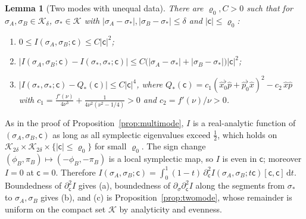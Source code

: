 \documentclass[11pt,a4paper]{article}
\makeatletter
\theoremstyle{stmt}
\newtheorem{lemma}[theorem]{Lemma}
\theoremstyle{defn}
\theoremstyle{rmk}
\renewenvironment{proof}[1][\proofname]{\par\pushQED{\qed}\normalfont\topsep6\p@\@plus6\p@\relax
  \trivlist\item[\hskip\labelsep{\sffamily\itshape\small #1.}]\ignorespaces}{\popQED\endtrivlist\@endpefalse}
\numberwithin{equation}{section}
\newcommand{\dd}{\mathrm{d}}
\makeatother
\begin{document}
\begin{lemma}[Two modes with unequal data]\label{lem:unequal}
There are $\varrho_0,C>0$ such that for $\sigma_A,\sigma_B\in\mathcal K_\delta$, $\sigma_*\in\mathcal K$ with $|\sigma_A-\sigma_*|,|\sigma_B-\sigma_*|\le\delta$ and $|\mathsf c|\le\varrho_0$:
\begin{enumerate}[label=\textup{(\alph*)}]
\item $0\le I(\sigma_A,\sigma_B;\mathsf c)\le C|\mathsf c|^2$;
\item $|I(\sigma_A,\sigma_B;\mathsf c)-I(\sigma_*,\sigma_*;\mathsf c)|\le C\big(|\sigma_A-\sigma_*|+|\sigma_B-\sigma_*|\big)|\mathsf c|^2$;
\item $|I(\sigma_*,\sigma_*;\mathsf c)-Q_*(\mathsf c)|\le C|\mathsf c|^4$, where $Q_*(\mathsf c)=c_1(\hat x_0^\flat\hat p+\hat p_0^\flat\hat x)^2-c_2\,\hat x\hat p$ with $c_1=\frac{f'(\nu)}{4\nu^3}+\frac{1}{4\nu^2(\nu^2-1/4)}>0$ and $c_2=f'(\nu)/\nu>0$.
\end{enumerate}
\end{lemma}

\begin{proof}
As in the proof of Proposition~\ref{prop:multimode}, $I$ is a real-analytic function of $(\sigma_A,\sigma_B,\mathsf c)$ as long as all symplectic eigenvalues exceed $\tfrac12$, which holds on $\mathcal K_{2\delta}\times\mathcal K_{2\delta}\times\{|\mathsf c|\le\varrho_0\}$ for small $\varrho_0$. The sign change $(\phi_B,\pi_B)\mapsto(-\phi_B,-\pi_B)$ is a local symplectic map, so $I$ is even in $\mathsf c$; moreover $I=0$ at $\mathsf c=0$. Therefore $I(\sigma_A,\sigma_B;\mathsf c)=\int_0^1(1-t)\,\partial_{\mathsf c}^2I(\sigma_A,\sigma_B;t\mathsf c)[\mathsf c,\mathsf c]\,\dd t$. Boundedness of $\partial_{\mathsf c}^2I$ gives (a), boundedness of $\partial_\sigma\partial_{\mathsf c}^2I$ along the segments from $\sigma_*$ to $\sigma_A,\sigma_B$ gives (b), and (c) is Proposition~\ref{prop:twomode}, whose remainder is uniform on the compact set $\mathcal K$ by analyticity and evenness.
\end{proof}
\end{document}
